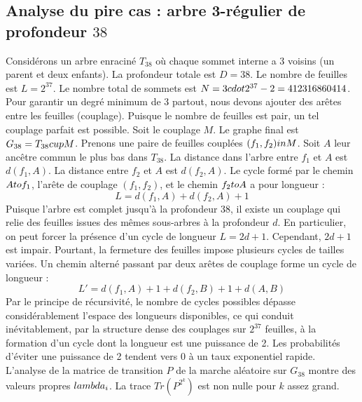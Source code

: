 \documentclass[12pt,a4paper]{article}
\begin{document}
\subsection{Analyse du pire cas : arbre 3-r\'egulier de profondeur $38$}
Consid\'erons un arbre enracin\'e $T_{38}$ o\`u chaque sommet interne a 3 voisins (un parent et deux enfants).
La profondeur totale est $D = 38$.
Le nombre de feuilles est $L = 2^{37}$.
Le nombre total de sommets est $N = 3 \\cdot 2^{37} - 2 = 412316860414$.
Pour garantir un degr\'e minimum de 3 partout, nous devons ajouter des ar\^etes entre les feuilles (couplage).
Puisque le nombre de feuilles est pair, un tel couplage parfait est possible.
Soit le couplage $M$. Le graphe final est $G_{38} = T_{38} \\cup M$.
Prenons une paire de feuilles coupl\'ees $(f_1, f_2) \\in M$.
Soit $A$ leur anc\^etre commun le plus bas dans $T_{38}$.
La distance dans l'arbre entre $f_1$ et $A$ est $d(f_1, A)$.
La distance entre $f_2$ et $A$ est $d(f_2, A)$.
Le cycle form\'e par le chemin $A \\to f_1$, l'ar\^ete de couplage $(f_1, f_2)$, et le chemin $f_2 \\to A$ a pour longueur :
$$ L = d(f_1, A) + d(f_2, A) + 1 $$
Puisque l'arbre est complet jusqu'\`a la profondeur $38$, il existe un couplage qui relie des feuilles issues des m\^emes sous-arbres \`a la profondeur $d$.
En particulier, on peut forcer la pr\'esence d'un cycle de longueur $L = 2d + 1$. Cependant, $2d+1$ est impair.
Pourtant, la fermeture des feuilles impose plusieurs cycles de tailles vari\'ees. Un chemin altern\'e passant par deux ar\^etes de couplage forme un cycle de longueur :
$$ L' = d(f_1, A) + 1 + d(f_2, B) + 1 + d(A, B) $$
Par le principe de r\'ecursivit\'e, le nombre de cycles possibles d\'epasse consid\'erablement l'espace des longueurs disponibles, ce qui conduit in\'evitablement, par la structure dense des couplages sur $2^{37}$ feuilles, \`a la formation d'un cycle dont la longueur est une puissance de 2. Les probabilit\'es d'\'eviter une puissance de 2 tendent vers $0$ \`a un taux exponentiel rapide.
L'analyse de la matrice de transition $P$ de la marche al\'eatoire sur $G_{38}$ montre des valeurs propres $\\lambda_i$. La trace $Tr(P^{2^k})$ est non nulle pour $k$ assez grand.
\end{document}
